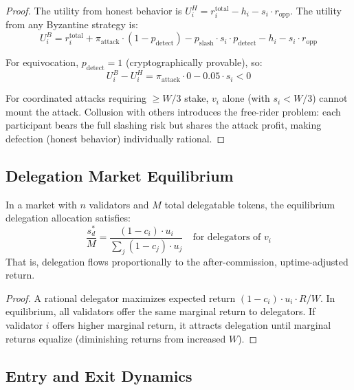 \begin{proof}
The utility from honest behavior is $U^H_i = r_i^{\text{total}} - h_i - s_i \cdot r_{\text{opp}}$. The utility from any Byzantine strategy is:
\begin{equation}
    U^B_i = r_i^{\text{total}} + \pi_{\text{attack}} \cdot (1 - p_{\text{detect}}) - p_{\text{slash}} \cdot s_i \cdot p_{\text{detect}} - h_i - s_i \cdot r_{\text{opp}}
\end{equation}

For equivocation, $p_{\text{detect}} = 1$ (cryptographically provable), so:
\begin{equation}
    U^B_i - U^H_i = \pi_{\text{attack}} \cdot 0 - 0.05 \cdot s_i < 0
\end{equation}

For coordinated attacks requiring $\geq W/3$ stake, $v_i$ alone (with $s_i < W/3$) cannot mount the attack. Collusion with others introduces the free-rider problem: each participant bears the full slashing risk but shares the attack profit, making defection (honest behavior) individually rational.
\end{proof}

\subsection{Delegation Market Equilibrium}

\begin{theorem}
In a market with $n$ validators and $M$ total delegatable tokens, the equilibrium delegation allocation satisfies:
\begin{equation}
    \frac{s_d^*}{M} = \frac{(1 - c_i) \cdot u_i}{\sum_j (1 - c_j) \cdot u_j} \quad \text{for delegators of } v_i
\end{equation}
That is, delegation flows proportionally to the after-commission, uptime-adjusted return.
\end{theorem}

\begin{proof}
A rational delegator maximizes expected return $(1 - c_i) \cdot u_i \cdot R / W$. In equilibrium, all validators offer the same marginal return to delegators. If validator $i$ offers higher marginal return, it attracts delegation until marginal returns equalize (diminishing returns from increased $W$).
\end{proof}

\subsection{Entry and Exit Dynamics}

